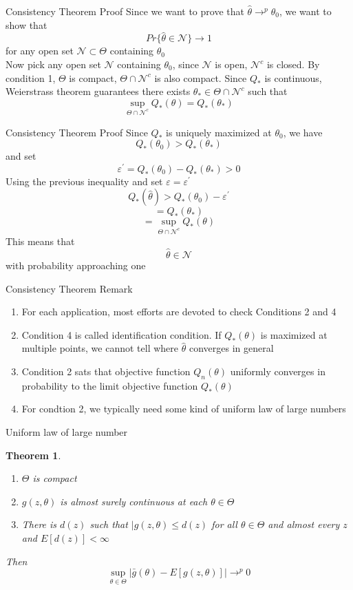 \documentclass{beamer}
\newtheorem{thm}{Theorem}[subsection]
\begin{document}
\begin{frame}{Consistency Theorem Proof}
	Since we want to prove that $\hat{\theta} \rightarrow^p \theta_0$, we want to show that 
	\[Pr\{\hat{\theta} \in \mathcal{N}\} \rightarrow 1\]
	for any open set $\mathcal{N} \subset \Theta$ containing $\theta_0$ \\
	Now pick any open set $\mathcal{N}$ containing $\theta_0$, since $\mathcal{N}$ is open, $\mathcal{N}^c$ is closed. By condition 1, $\Theta$ is compact, $\Theta \cap \mathcal{N}^c$ is also compact. Since $Q_*$ is continuous, Weierstrass theorem guarantees there exists $\theta_* \in \Theta \cap \mathcal{N}^c$ such that 
	\[\sup_{\Theta \cap \mathcal{N}^c} Q_*(\theta) = Q_*(\theta_*)\]
\end{frame}
\begin{frame}{Consistency Theorem Proof}
	Since $Q_*$ is uniquely maximized at $\theta_0$, we have 
	\[Q_*(\theta_0) > Q_*(\theta_*)\]
	and set
	\[\varepsilon^{'} = Q_*(\theta_0) - Q_*(\theta_*) > 0\]
	Using the previous inequality and set $\varepsilon = \varepsilon^{'}$
	\[Q_*(\hat{\theta}) > Q_*(\theta_0) - \varepsilon^{'}\]
	\[ =  Q_*(\theta_*)\]
	\[= \sup_{\Theta \cap \mathcal{N}^c} Q_*(\theta)\]
	This means that 
	\[\hat{\theta} \in \mathcal{N}\]
	with probability approaching one
\end{frame}

\begin{frame}{Consistency Theorem Remark}
	\begin{enumerate}
		\item For each application, most efforts are devoted to check Conditions 2 and 4
		\item Condition 4 is called identification condition. If $Q_*(\theta)$ is maximized at multiple points, we cannot tell where $\hat{\theta}$ converges in general
		\item Condition 2 sats that objective function $Q_n(\theta)$ uniformly converges in probability to the limit objective function $Q_*(\theta)$
		\item For condtion 2, we typically need some kind of uniform law of large numbers
	\end{enumerate}
\end{frame}

\begin{frame}{Uniform law of large number}
	\begin{thm}
		\begin{enumerate}
				\item $\Theta$ is compact
				\item $g(z,\theta)$ is almost surely continuous at each $\theta \in \Theta$
				\item There is $d(z)$ such that $|g(z,\theta) \leq d(z)$ for all $\theta \in \Theta$ and almost every $z$ and $E[d(z)] < \infty$
		\end{enumerate}
		Then 
		\[\sup_{\theta \in \Theta} |\bar{g}(\theta) - E[g(z,\theta)]| \rightarrow^p 0\]
	\end{thm}
\end{frame}
\end{document}
